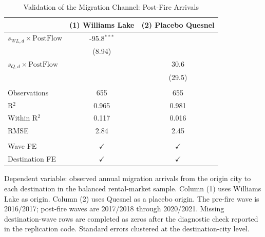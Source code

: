 \begin{table}[htbp]
   \caption{\label{tab:channel_validation} Validation of the Migration Channel: Post-Fire Arrivals}
   \bigskip
   \centering
   \begin{tabular}{lcc}
      \toprule
                                            & (1) Williams Lake & (2) Placebo Quesnel \\  
      \midrule 
      $s_{WL,d} \times \mathrm{PostFlow}$   & -95.8$^{***}$ &   \\   
                                            & (8.94)        &   \\   
      $s_{Q,d} \times \mathrm{PostFlow}$    &               & 30.6\\   
                                            &               & (29.5)\\   
       \\
      Observations                          & 655           & 655\\  
      R$^2$                                 & 0.965         & 0.981\\  
      Within R$^2$                          & 0.117         & 0.016\\  
      RMSE                                  & 2.84          & 2.45\\  
       \\
      Wave FE                               & $\checkmark$  & $\checkmark$\\   
      Destination FE                        & $\checkmark$  & $\checkmark$\\   
      \bottomrule
   \end{tabular}
   
   \par \raggedright 
   Dependent variable: observed annual migration arrivals from the origin city to each destination in the balanced rental-market sample. Column (1) uses Williams Lake as origin. Column (2) uses Quesnel as a placebo origin. The pre-fire wave is 2016/2017; post-fire waves are 2017/2018 through 2020/2021. Missing destination-wave rows are completed as zeros after the diagnostic check reported in the replication code. Standard errors clustered at the destination-city level.
\end{table}
